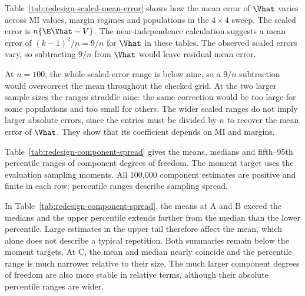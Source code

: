 Table~\ref{tab:redesign-scaled-mean-error} shows how the mean error of
\(\Vhat\) varies across MI values, margin regimes and populations in
the \(4\times4\) sweep. The scaled error is \(n\{\E\Vhat-V\}\).
The near-independence calculation suggests a mean error of
\((k-1)^2/n=9/n\) for \(\Vhat\) in these tables. The observed scaled
errors vary, so subtracting \(9/n\) from \(\Vhat\) would leave
residual mean error.

\begin{table}[!htbp]
\centering
\caption{Scaled mean error across the \(4\times4\) MI sweep.}
\label{tab:redesign-scaled-mean-error}

\end{table}

At \(n=100\), the whole scaled-error range is below nine, so a
\(9/n\) subtraction would overcorrect the mean throughout the checked
grid. At the two larger sample sizes the ranges straddle nine: the same
correction would be too large for some populations and too small for
others. The wider scaled ranges do not imply larger absolute errors,
since the entries must be divided by \(n\) to recover the mean error
of \(\Vhat\). They show that its coefficient depends on MI and margins.

Table~\ref{tab:redesign-component-spread} gives the means, medians and
fifth--95th percentile ranges of component degrees of freedom. The
moment target uses the evaluation sampling moments. All 100,000
component estimates are positive and finite in each row; percentile
ranges describe sampling spread.

\begin{table}[H]
\centering
\small
\setlength{\tabcolsep}{3pt}
\caption{Sampling spread of component degrees of freedom.}
\label{tab:redesign-component-spread}

\end{table}

In Table~\ref{tab:redesign-component-spread}, the means at A and B exceed the medians and the upper percentile extends
farther from the median than the lower percentile. Large estimates in
the upper tail therefore affect the mean, which alone does not describe
a typical repetition. Both summaries remain below the moment targets.
At C, the mean and median nearly coincide and the
percentile range is much narrower relative to their size. The much
larger component degrees of freedom are also more stable in relative
terms, although their absolute percentile ranges are wider.

